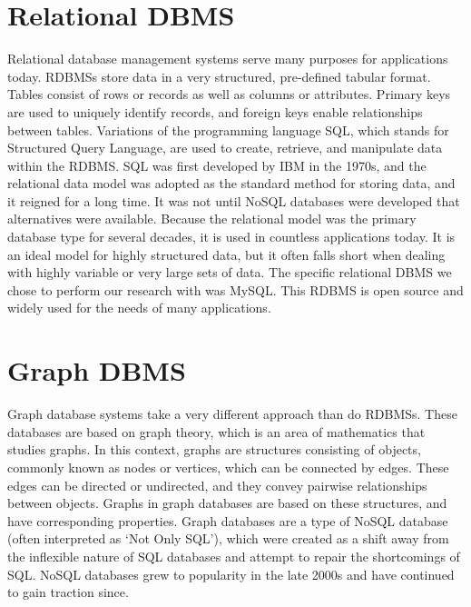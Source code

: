 \documentclass{IEEEtran}
\begin{document}
\section{Relational DBMS}

Relational database management systems serve many purposes for applications today. RDBMSs store data in a very structured, pre-defined tabular format. Tables consist of rows or records as well as columns or attributes. Primary keys are used to uniquely identify records, and foreign keys enable relationships between tables. Variations of the programming language SQL, which stands for Structured Query Language, are used to create, retrieve, and manipulate data within the RDBMS. SQL was first developed by IBM in the 1970s, and the relational data model was adopted as the standard method for storing data, and it reigned for a long time. It was not until NoSQL databases were developed that alternatives were available. Because the relational model was the primary database type for several decades, it is used in countless applications today. It is an ideal model for highly structured data, but it often falls short when dealing with highly variable or very large sets of data. The specific relational DBMS we chose to perform our research with was MySQL. This RDBMS is open source and widely used for the needs of many applications.   

\section{Graph DBMS}

Graph database systems take a very different approach than do RDBMSs. These databases are based on graph theory, which is an area of mathematics that studies graphs. In this context, graphs are structures consisting of objects, commonly known as nodes or vertices, which can be connected by edges. These edges can be directed or undirected, and they convey pairwise relationships between objects. Graphs in graph databases are based on these structures, and have corresponding properties. Graph databases are a type of NoSQL database (often interpreted as ‘Not Only SQL’), which were created as a shift away from the inflexible nature of SQL databases and attempt to repair the shortcomings of SQL. NoSQL databases grew to popularity in the late 2000s and have continued to gain traction since. 
\end{document}
